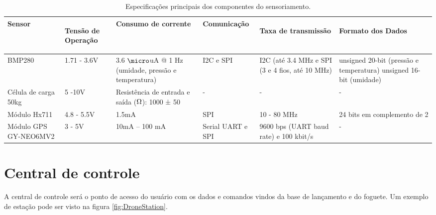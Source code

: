 \begin{center}
\begin{table}[H]
\centering
\begin{tabular}{ |m{2cm}|m{2cm}|m{2.5cm}|m{2.5cm}|m{2.5cm}|m{2.5cm}| } 
\hline

\textbf{ Sensor }&\begin{center}
\textbf{ Tensão de Operação} \end{center}& \textbf{Consumo de corrente }& \textbf{Comunicação} & \begin{center}\textbf{Taxa de transmissão} \end{center} & \begin{center}\textbf{Formato dos Dados}\end{center}\\ 
 \hline
 
 BMP280 & 1.71 - 3.6V & 3.6 $\micro$uA @ 1 Hz (umidade, pressão e temperatura) & 
I2C e SPI & I2C (até 3.4 MHz e SPI (3 e 4 fios, até 10 MHz) & unsigned 20-bit (pressão e temperatura) unsigned 16-bit (umidade)\\
  \hline
Célula de carga 50kg & 5 -10V & Resistência de entrada e saída ($\ohm$): 1000 ± 50 & - & - & - \\
  \hline
 Módulo Hx711 & 4.8 - 5.5V & 1.5mA & SPI & 10 - 80 MHz & 24 bits em complemento de 2 \\ 
  \hline
 Módulo GPS GY-NEO6MV2 & 3 - 5V & 10mA – 100 mA & Serial UART e SPI & 9600 bps (UART baud rate) e 100 kbit/s & - \\ 
 \hline 

\end{tabular}
\caption{Especificações principais dos componentes do sensoriamento.}
\label{tab:sensores}
\end{table}
\end{center}


\section{Central de controle}

\par A central de controle será o ponto de acesso do usuário com os dados e comandos vindos da base de lançamento e do foguete. Um exemplo de estação pode ser visto na figura \ref{fig:DroneStation}. 

